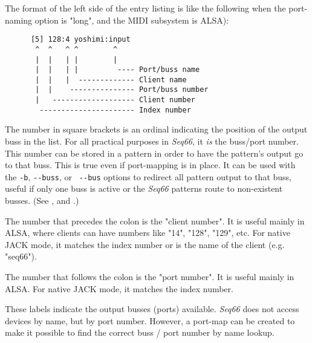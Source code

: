    The format of the left side of the entry listing is like the following
   when the port-naming option is "long", and the
   MIDI subsystem is ALSA):

   \begin{verbatim}
      [5] 128:4 yoshimi:input
       ^  ^   ^ ^        ^
       |  |   | |        |
       |  |   | |         ---- Port/buss name
       |  |   |  ------------- Client name
       |  |    --------------- Port/buss number
       |   ------------------- Client number
        ---------------------- Index number
   \end{verbatim}

   \setcounter{ItemCounter}{0}      %

   The number in square brackets is an ordinal indicating the position
   of the output buss in the list.
   For all practical purposes in \textsl{Seq66}, it \textsl{is} the
   buss/port number.  This number can be stored in a pattern in order to have
   the pattern's output go to that buss.  
   This is true even if port-mapping is in place.
   It can be used with the \texttt{-b},
   \texttt{-{}-buss}, or \texttt{ -{}-bus} options to redirect all
   pattern output to that buss, useful if only one buss is active or the
   \textsl{Seq66} patterns route to non-existent busses.
   (See ,
   and .)

   The number that precedes the colon is the "client number".
   It is useful mainly in ALSA, where clients can have numbers like "14",
   "128", "129", etc.  For native JACK mode, it matches the index number or is
   the name of the client (e.g. "seq66").

   The number that follows the colon is the "port number".
   It is useful mainly in ALSA.
   For native JACK mode, it matches the index number.

   These labels indicate the output busses (ports) available.
   \textsl{Seq66} does not access devices by name, but by port number.
   However, a port-map can be created to make it possible to find the correct
   buss / port number by name lookup.

